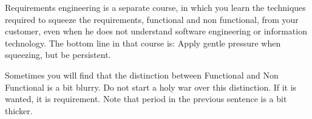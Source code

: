 \documentclass[\docroot/main]{subfiles}
\begin{document}
Requirements engineering is a separate course, in which you learn the
techniques required to squeeze the requirements, functional and non
functional, from your customer, even when he does not understand
software engineering or information technology. The bottom line in
that course is: Apply gentle pressure when squeezing, but be persistent.

Sometimes you will find that the distinction between Functional and
Non Functional is a bit blurry. Do not start a holy war over this
distinction. If it is wanted, it is requirement. Note that  period in
the previous sentence is a bit thicker.
\end{document}
